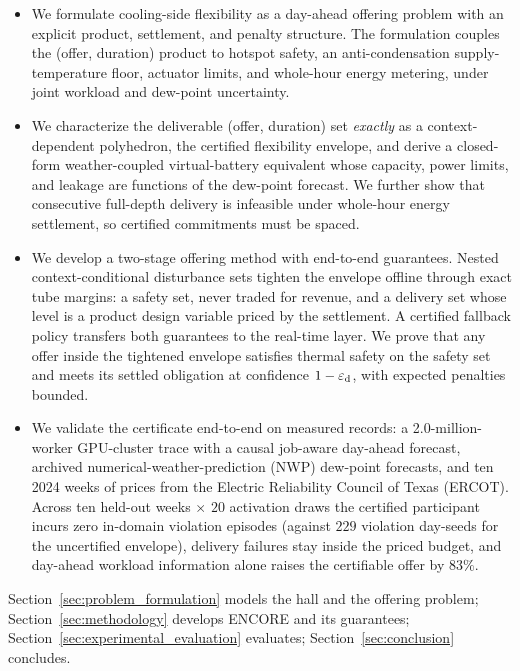 \begin{itemize}
\item We formulate cooling-side flexibility as a day-ahead offering problem
with an explicit product, settlement, and penalty structure. The formulation
couples the (offer, duration) product to hotspot safety, an anti-condensation
supply-temperature floor, actuator limits, and whole-hour energy metering,
under joint workload and dew-point uncertainty.

\item We characterize the deliverable (offer, duration) set \emph{exactly} as
a context-dependent polyhedron, the certified flexibility envelope, and
derive a closed-form weather-coupled virtual-battery equivalent whose
capacity, power limits, and leakage are functions of the dew-point forecast.
We further show that consecutive full-depth delivery is infeasible under
whole-hour energy settlement, so certified commitments must be spaced.

\item We develop a two-stage offering method with end-to-end guarantees.
Nested context-conditional disturbance sets tighten the envelope offline
through exact tube margins: a safety set, never traded for revenue, and a
delivery set whose level is a product design variable priced by the
settlement. A certified fallback policy transfers both guarantees to the
real-time layer. We prove that any
offer inside the tightened envelope satisfies thermal safety on the safety
set and meets its settled obligation at confidence $1-\varepsilon_{\mathrm{d}}$, with expected
penalties bounded.

\item We validate the certificate end-to-end on measured records: a
2.0-million-worker GPU-cluster trace with a causal job-aware day-ahead
forecast, archived numerical-weather-prediction (NWP) dew-point forecasts,
and ten 2024 weeks of prices from the Electric Reliability Council of Texas
(ERCOT). Across ten held-out weeks $\times$ $20$ activation draws the
certified participant incurs zero in-domain violation episodes (against
$229$ violation day-seeds for the uncertified envelope), delivery failures
stay inside the priced budget, and day-ahead workload information alone
raises the certifiable offer by $83\%$.
\end{itemize}

Section~\ref{sec:problem_formulation} models the hall and the offering
problem; Section~\ref{sec:methodology} develops ENCORE and its guarantees;
Section~\ref{sec:experimental_evaluation} evaluates;
Section~\ref{sec:conclusion} concludes.
